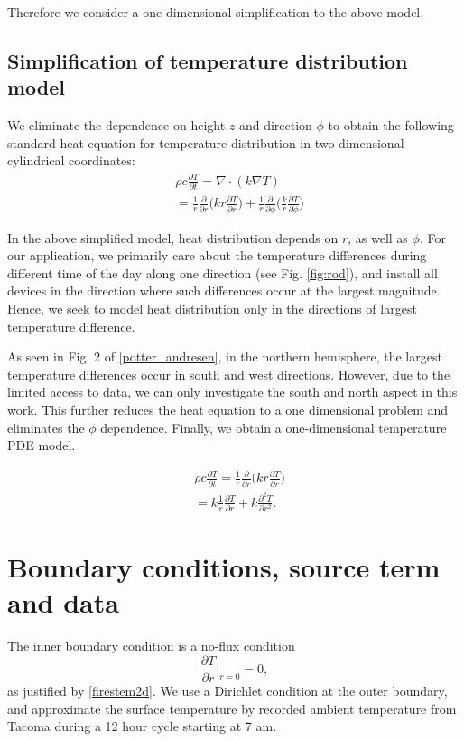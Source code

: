 \documentclass{IEEEtran} %
\begin{document}
Therefore we consider a one dimensional simplification to the above model. 

\subsection{Simplification of temperature distribution model}

We eliminate the dependence on height $z$ and direction $\phi$ to obtain the following standard heat equation for temperature distribution in two dimensional cylindrical coordinates:
\begin{align}
&\rho c\frac{\partial T}{\partial t}=\nabla\cdot(k\nabla T)\nonumber\\%
&=\frac{1}{r}\frac{\partial}{\partial r}\bigg(kr\frac{\partial T}{\partial r}\bigg)+\frac{1}{r}\frac{\partial}{\partial \phi}\bigg(\frac{k}{r}\frac{\partial T}{\partial \phi}\bigg)\label{heat2d}%
\end{align}

In the above simplified model, heat distribution depends on $r$, as well as $\phi$. For our application, we primarily care about the temperature differences during different time of the day along one direction (see Fig. \ref{fig:rod}), and install all devices in the direction where such differences occur at the largest magnitude. Hence, we seek to model heat distribution only in the directions of largest temperature difference. 

As seen in Fig. 2 of \ref{potter_andresen}, in the northern hemisphere, the largest temperature differences occur in south and west directions. However, due to the limited access to data, we can only investigate the south and north aspect in this work. This further reduces the heat equation to a one dimensional problem and eliminates the $\phi$ dependence. Finally, we obtain a one-dimensional temperature PDE model. 

\begin{align}
&\rho c\frac{\partial T}{\partial t}=\frac{1}{r}\frac{\partial}{\partial r}\bigg(kr\frac{\partial T}{\partial r}\bigg)\nonumber\\%
&=k\frac{1}{r}\frac{\partial T}{\partial r}+k\frac{\partial^2T}{\partial r^2}.\label{heat1d}%
\end{align}

\section{Boundary conditions, source term and data} 
The inner boundary condition is a no-flux condition
\begin{equation}
    \frac{\partial T}{\partial r}\bigg|_{r=0}=0,
\end{equation} as justified by \ref{firestem2d}.
We use a Dirichlet condition at the outer boundary, and approximate the surface temperature by recorded ambient temperature from Tacoma during a 12 hour cycle starting at 7 am. 
\end{document}
